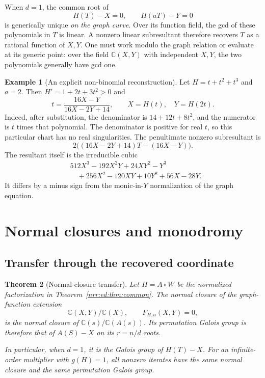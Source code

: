 \documentclass[11pt,letterpaper]{article}
\newtheorem{theorem}{Theorem}[section]
\theoremstyle{definition}
\newtheorem{example}[theorem]{Example}
\theoremstyle{remark}
\newcommand{\C}{\mathbb C}
\begin{document}
When $d=1$, the common root of
\[
 H(T)-X=0,\qquad H(aT)-Y=0
\]
is generically unique \emph{on the graph curve}. Over its function field, the gcd
of these polynomials in $T$ is linear. A nonzero linear subresultant therefore
recovers $T$ as a rational function of $X,Y$. One must work modulo the graph
relation or evaluate at its generic point: over the field $\C(X,Y)$ with
independent $X,Y$, the two polynomials generally have gcd one.

\begin{example}[An explicit non-binomial reconstruction]
\label{nrr:ed:ex:recovery}
Let $H=t+t^2+t^3$ and $a=2$. Then $H'=1+2t+3t^2>0$ and
\begin{equation}
 t=\frac{16X-Y}{16X-2Y+14},\qquad X=H(t),\quad Y=H(2t).
 \label{nrr:ed:eq:cubic-recovery}
\end{equation}
Indeed, after substitution, the denominator is $14+12t+8t^2$, and the numerator
is $t$ times that polynomial. The denominator is positive for real $t$, so this
particular chart has no real singularities. The penultimate nonzero subresultant is
\[
 2\bigl((16X-2Y+14)T-(16X-Y)\bigr).
\]
The resultant itself is the irreducible cubic
\begin{align*}
 &512X^3-192X^2Y+24XY^2-Y^3\\
 &\hspace{1em}{}+256X^2-120XY+10Y^2+56X-28Y.
\end{align*}
It differs by a minus sign from the monic-in-$Y$ normalization of the graph equation.
\end{example}

\section{Normal closures and monodromy}
\label{nrr:ed:sec:monodromy}

\subsection{Transfer through the recovered coordinate}

\begin{theorem}[Normal-closure transfer]
\label{nrr:ed:thm:galois}
Let $H=A\circ W$ be the normalized factorization in Theorem~\ref{nrr:ed:thm:common}.
The normal closure of the graph-function extension
\[
 \C(X,Y)/\C(X),\qquad F_{H,a}(X,Y)=0,
\]
is the normal closure of $\C(s)/\C(A(s))$. Its permutation Galois group is
therefore that of $A(S)-X$ on its $r=n/d$ roots.

In particular, when $d=1$, it is the Galois group of $H(T)-X$. For an
infinite-order multiplier with $g(H)=1$, all nonzero iterates have the same
normal closure and the same permutation Galois group.
\end{theorem}
\end{document}
